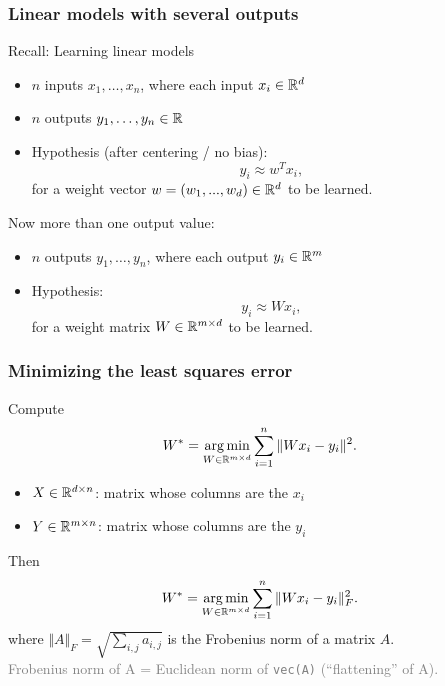 \documentclass[aspectratio=149]{beamer}
\begin{document}
\begin{frame}
  \frametitle{Linear models with several outputs}
  Recall: Learning linear models
  \begin{itemize}
    \item $n$ inputs $x_1,\dots,x_n$, where each input $x_i \in \mathbb{R}^d$
    \item $n$ outputs $y_1,\dots,y_n \in \mathbb{R}$
    \item Hypothesis (after centering / no bias):
          \begin{equation}
            y_i \approx w^T x_i ,
          \end{equation}
          for a weight vector $w = (w_1,...,w_d) \in \mathbb{R}^d$ to be learned.
  \end{itemize}

  Now more than one output value:
  \begin{itemize}
    \item $n$ outputs $y_1,\dots,y_n$, where each output $y_i \in \mathbb{R}^m$
    \item Hypothesis:
          \begin{equation}
            y_i \approx W x_i,
          \end{equation}
          for a weight matrix $W \in \mathbb{R}^{m\times d}$ to be learned.
  \end{itemize}
\end{frame}


\begin{frame}
  \frametitle{Minimizing the least squares error}

  Compute
  \begin{equation}
    W^* = \operatorname*{arg\,min}_{W\in \mathbb{R}^{m\times d}} \sum_{i=1}^{n} \Vert W x_i - y_i \Vert^2.
  \end{equation}

  \begin{itemize}
    \item $X \in \mathbb{R}^{d \times n}$: matrix whose columns are the $x_i$
    \item $Y \in \mathbb{R}^{m \times n}$: matrix whose columns are the $y_i$
  \end{itemize}
  Then
  \begin{equation}
    W^* = \operatorname*{arg\,min}_{W\in \mathbb{R}^{m\times d}} \sum_{i=1}^{n} \Vert W x_i - y_i \Vert_F^2.
  \end{equation}
  where $\Vert A \Vert_F = \sqrt{\sum_{i,j} a_{i,j}}$ is the Frobenius norm of a matrix $A$.\\
  \textcolor{gray}{Frobenius norm of A = Euclidean norm of \texttt{vec(A)} (``flattening'' of A).}

\end{frame}
\end{document}

